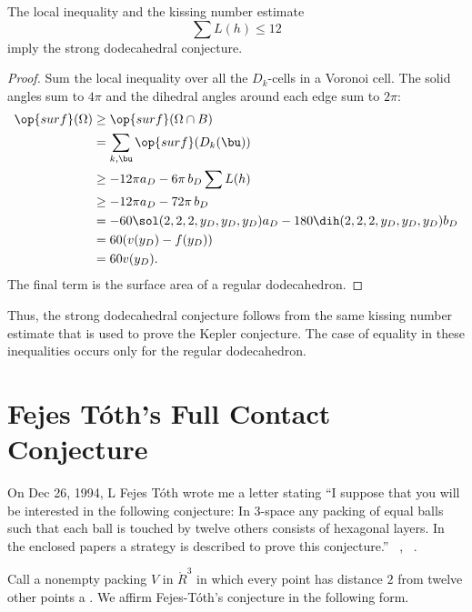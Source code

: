 \begin{lemma}[]
  The local inequality and the kissing number estimate 
\[
\sum L(h) \le 12
\]
imply the strong dodecahedral conjecture.
\end{lemma}

\begin{proof} 
  Sum the local inequality over all the $D_k$-cells in a Voronoi cell.
  The solid angles sum to $4\pi$ and the dihedral angles around each
  edge sum to $2\pi$:
\begin{align*}
  \op{surf}(\Omega) &\ge \op{surf}(\Omega\cap B)\\
  &=\sum_{k,\bu} \op{surf}(D_k(\bu))\\
  &\ge -12\pi a_D - 6\pi\, b_D  \sum L(h)\\
  &\ge -12\pi a_D - 72\pi\, b_D\\
  &= -60 \sol(2,2,2,y_D,y_D,y_D) a_D - 180 \dih(2,2,2,y_D,y_D,y_D) b_D\\
  &= 60 (v(y_D) - f(y_D))\\
  &= 60 v(y_D).\\
\end{align*}
The final term is the surface area of a regular dodecahedron.
\end{proof}

Thus, the strong dodecahedral conjecture follows from the same kissing
number estimate that is used to prove the Kepler conjecture.  The case
of equality in these inequalities occurs only for the regular
dodecahedron.

\newpage
\section{Fejes T\'oth's Full Contact Conjecture}


On Dec 26, 1994, L Fejes T\'oth wrote me a letter stating ``I suppose that you will be
interested in the following conjecture: In $3$-space any packing of equal
balls such that each ball is touched by twelve others consists of hexagonal layers.
In the enclosed papers a strategy is described to prove this conjecture.''
~\cite{Fejes-Toth:89}, ~\cite{Fejes-Toth:69}.

Call a nonempty packing $ V$ in $\ring{R}^3$ in which every point has
distance  $2$ from twelve other points a .   We affirm Fejes-T\'oth's conjecture in the following form.
%
%
%


